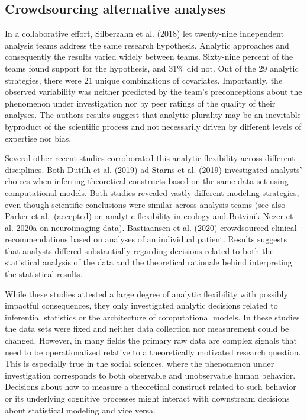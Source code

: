 \documentclass[
  12pt,
]{article}
\begin{document}
\hypertarget{crowdsourcing-alternative-analyses}{%
\subsection{Crowdsourcing alternative analyses}\label{crowdsourcing-alternative-analyses}}

In a collaborative effort, Silberzahn et al. (2018) let twenty-nine independent analysis teams address the same research hypothesis.
Analytic approaches and consequently the results varied widely between teams.
Sixty-nine percent of the teams found support for the hypothesis, and 31\% did not.
Out of the 29 analytic strategies, there were 21 unique combinations of covariates.
Importantly, the observed variability was neither predicted by the team's preconceptions about the phenomenon under investigation nor by peer ratings of the quality of their analyses.
The authors results suggest that analytic plurality may be an inevitable byproduct of the scientific process and not necessarily driven by different levels of expertise nor bias.

Several other recent studies corroborated this analytic flexibility across different disciplines.
Both Dutilh et al. (2019) ad Starns et al. (2019) investigated analysts' choices when inferring theoretical constructs based on the same data set using computational models.
Both studies revealed vastly different modeling strategies, even though scientific conclusions were similar across analysis teams (see also Parker et al.~(accepted) on analytic flexibility in ecology and Botvinik-Nezer et al. 2020a on neuroimaging data).
Bastiaansen et al. (2020) crowdsourced clinical recommendations based on analyses of an individual patient.
Results suggests that analysts differed substantially regarding decisions related to both the statistical analysis of the data and the theoretical rationale behind interpreting the statistical results.

While these studies attested a large degree of analytic flexibility with possibly impactful consequences, they only investigated analytic decisions related to inferential statistics or the architecture of computational models.
In these studies the data sets were fixed and neither data collection nor measurement could be changed.
However, in many fields the primary raw data are complex signals that need to be operationalized relative to a theoretically motivated research question.
This is especially true in the social sciences, where the phenomenon under investigation corresponds to both observable and unobservable human behavior.
Decisions about how to measure a theoretical construct related to such behavior or its underlying cognitive processes might interact with downstream decisions about statistical modeling and vice versa.
\end{document}
